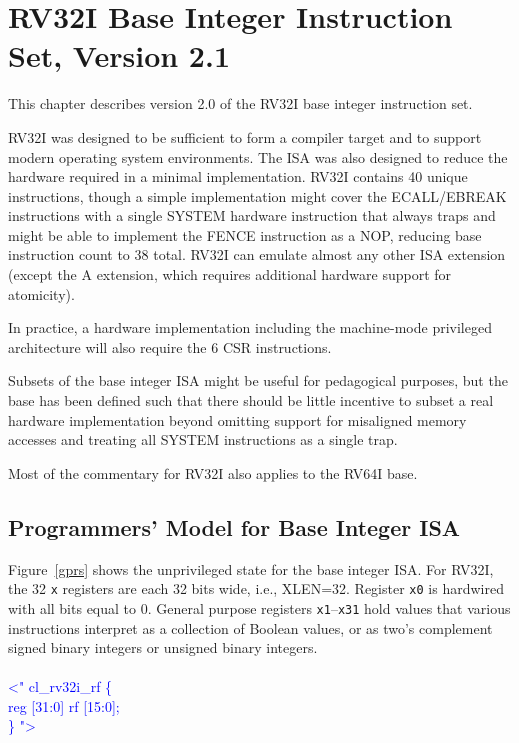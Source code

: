 \chapter{RV32I Base Integer Instruction Set, Version 2.1}
\label{rv32}

This chapter describes version 2.0 of the RV32I base integer
instruction set.

\begin{commentary}
RV32I was designed to be sufficient to form a compiler target and to
support modern operating system environments.  The ISA was also
designed to reduce the hardware required in a minimal implementation.
RV32I contains 40 unique instructions, though a simple implementation
might cover the ECALL/EBREAK instructions with a single SYSTEM
hardware instruction that always traps and might be able to implement
the FENCE instruction as a NOP, reducing base instruction count to 38
total.  RV32I can emulate almost any other ISA extension (except the A
extension, which requires additional hardware support for atomicity).

In practice, a hardware implementation including the machine-mode
privileged architecture will also require the 6 CSR instructions.

Subsets of the base integer ISA might be useful for pedagogical
purposes, but the base has been defined such that there should be
little incentive to subset a real hardware implementation beyond
omitting support for misaligned memory accesses and treating all
SYSTEM instructions as a single trap.
\end{commentary}

\begin{commentary}
Most of the commentary for RV32I also applies to the RV64I base.
\end{commentary}

\section{Programmers' Model for Base Integer ISA}

\setlength\parindent{24pt}

Figure~\ref{gprs} shows the unprivileged state for the base integer
ISA.  For RV32I, the 32 {\tt x} registers are each 32 bits wide, i.e.,
XLEN=32.  Register {\tt x0} is hardwired with all bits equal to 0.
General purpose registers {\tt x1}--{\tt x31} hold values that various
instructions interpret as a collection of Boolean values, or as two's
complement signed binary integers or unsigned binary integers.\\
\\
\textcolor{blue}{
\noindent \textless" cl\_rv32i\_rf \{\\%
\indent reg [31:0] rf [15:0]; \\%
\} "\textgreater\\%
}


